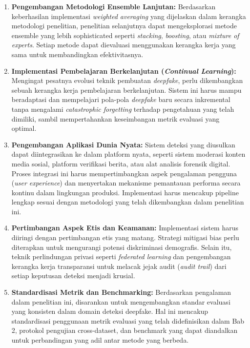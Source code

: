 \begin{enumerate}
    \item \textbf{Pengembangan Metodologi Ensemble Lanjutan:} Berdasarkan keberhasilan implementasi \textit{weighted averaging} yang dijelaskan dalam kerangka metodologi penelitian, penelitian selanjutnya dapat mengeksplorasi metode ensemble yang lebih sophisticated seperti \textit{stacking}, \textit{boosting}, atau \textit{mixture of experts}. Setiap metode dapat dievaluasi menggunakan kerangka kerja yang sama untuk membandingkan efektivitasnya.

    \item \textbf{Implementasi Pembelajaran Berkelanjutan (\textit{Continual Learning}):} Mengingat pesatnya evolusi teknik pembuatan \textit{deepfake}, perlu dikembangkan sebuah kerangka kerja pembelajaran berkelanjutan. Sistem ini harus mampu beradaptasi dan mempelajari pola-pola \textit{deepfake} baru secara inkremental tanpa mengalami \textit{catastrophic forgetting} terhadap pengetahuan yang telah dimiliki, sambil mempertahankan keseimbangan metrik evaluasi yang optimal.

    \item \textbf{Pengembangan Aplikasi Dunia Nyata:} Sistem deteksi yang diusulkan dapat diintegrasikan ke dalam platform nyata, seperti sistem moderasi konten media sosial, platform verifikasi berita, atau alat analisis forensik digital. Proses integrasi ini harus mempertimbangkan aspek pengalaman pengguna (\textit{user experience}) dan menyertakan mekanisme pemantauan performa secara kontinu dalam lingkungan produksi. Implementasi harus mencakup pipeline lengkap sesuai dengan metodologi yang telah dikembangkan dalam penelitian ini.

    \item \textbf{Pertimbangan Aspek Etis dan Keamanan:} Implementasi sistem harus diiringi dengan pertimbangan etis yang matang. Strategi mitigasi bias perlu diterapkan untuk mengurangi potensi diskriminasi demografis. Selain itu, teknik perlindungan privasi seperti \textit{federated learning} dan pengembangan kerangka kerja transparansi untuk melacak jejak audit (\textit{audit trail}) dari setiap keputusan deteksi menjadi krusial.

    \item \textbf{Standardisasi Metrik dan Benchmarking:} Berdasarkan pengalaman dalam penelitian ini, disarankan untuk mengembangkan standar evaluasi yang konsisten dalam domain deteksi deepfake. Hal ini mencakup standardisasi penggunaan metrik evaluasi yang telah didefinisikan dalam Bab 2, protokol pengujian cross-dataset, dan benchmark yang dapat diandalkan untuk perbandingan yang adil antar metode yang berbeda.
\end{enumerate}